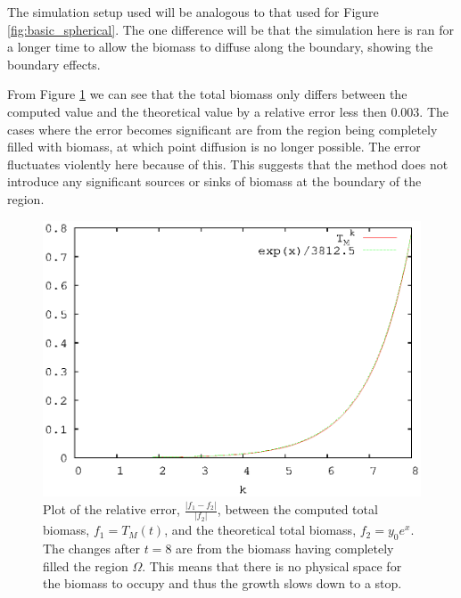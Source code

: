   The simulation setup used will be analogous to that used for Figure \ref{fig:basic_spherical}.
  The one difference will be that the simulation here is ran for a longer time to allow the biomass to diffuse along the boundary, showing the boundary effects.
 
  From Figure \ref{fig:basic_growth} we can see that the total biomass only differs between the computed value and the theoretical value by a relative error less then $0.003$.
  The cases where the error becomes significant are from the region being completely filled with biomass, at which point diffusion is no longer possible.
  The error fluctuates violently here because of this.
  This suggests that the method does not introduce any significant sources or sinks of biomass at the boundary of the region.

  \begin{figure}
    \centering
    \includegraphics[scale = 0.9]{basic_growth}
    \caption{Plot of the relative error, $\frac{|f_1 - f_2|}{|f_2|}$, between the computed total biomass, $f_1 = T_{M}(t)$, and the theoretical total biomass, $f_2 = y_0 e^x$. 
      The changes after $t = 8$ are from the biomass having completely filled the region $\Omega$.
      This means that there is no physical space for the biomass to occupy and thus the growth slows down to a stop.}
    \label{fig:basic_growth}
  \end{figure}
  
